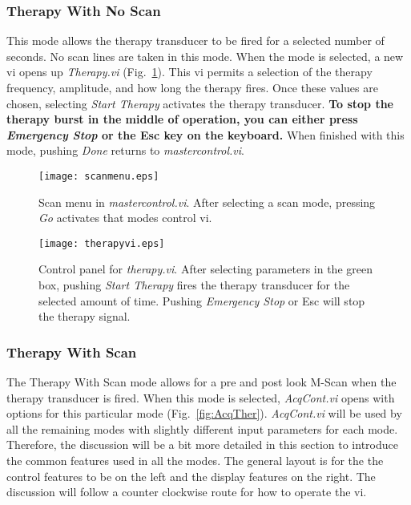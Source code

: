 \documentclass[10pt]{article}
\begin{document}
\subsubsection{Therapy With No Scan}
\label{sec:thernoscan}

This mode allows the therapy transducer to be fired for a selected
number of seconds. No scan lines are taken in this mode. When the
mode is selected, a new vi opens up {\it Therapy.vi}
(Fig.~\ref{fig:therapyvi}). This vi permits a selection of the
therapy frequency, amplitude, and how long the therapy fires. Once
these values are chosen, selecting {\it Start Therapy} activates
the therapy transducer. {\bf To stop the therapy burst in the
middle of operation, you can either press {\it Emergency Stop} or
the Esc key on the keyboard.} When finished with this mode,
pushing {\it Done} returns to {\it mastercontrol.vi}.

\begin{figure}
\begin{minipage}[t]{0.5\linewidth}
\centering
\texttt{[image: scanmenu.eps]}
 \caption{Scan menu in {\it mastercontrol.vi}. After selecting a scan mode,
 pressing {\it Go} activates that modes control vi.}
\label{fig:scanmenu}
\end{minipage}%
\begin{minipage}[t]{0.5\linewidth}
\centering
\texttt{[image: therapyvi.eps]}
\caption{Control panel for {\it therapy.vi}. After selecting
parameters in the green box, pushing {\it Start Therapy} fires the
therapy transducer for the selected amount of time. Pushing {\it
Emergency Stop} or Esc will stop the therapy signal.}
  \label{fig:therapyvi}
\end{minipage}
\end{figure}

\subsubsection{Therapy With Scan}
\label{sec:therscan}

The Therapy With Scan mode allows for a pre and post look M-Scan
when the therapy transducer is fired. When this mode is selected,
{\it AcqCont.vi} opens with options for this particular mode
(Fig.~\ref{fig:AcqTher}). {\it AcqCont.vi} will be used by all the
remaining modes with slightly different input parameters for each
mode. Therefore, the discussion will be a bit more detailed in
this section to introduce the common features used in all the
modes. The general layout is for the the control features to be on
the left and the display features on the right. The discussion
will follow a counter clockwise route for how to operate the vi.
\end{document}
